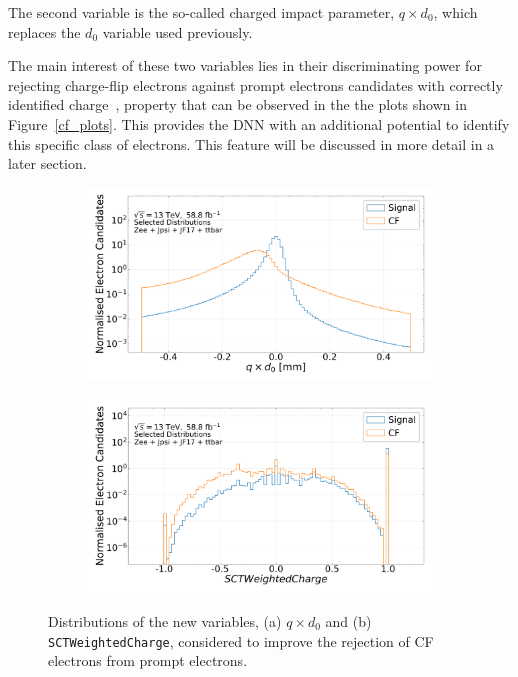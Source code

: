 The second variable is the so-called charged impact parameter, $q \times d_{0}$, which replaces the $d_{0}$ variable used previously.

The main interest of these two variables lies in their discriminating power for rejecting charge-flip electrons against prompt electrons candidates with correctly identified charge~\cite{carnelli}, property that can be observed in the the plots shown in Figure~\ref{cf_plots}. This provides the DNN with an additional potential to identify this specific class of electrons. This feature will be discussed in more detail in a later section.

\begin{figure}[htbp]
  \centering
  \begin{subfigure}[b]{0.49\textwidth}
      \includegraphics[width=\textwidth]{images/selection_MultiClass_qd0_train.pdf}
      \caption{}
  \end{subfigure}
  \begin{subfigure}[b]{0.49\textwidth}
      \includegraphics[width=\textwidth]{images/selection_MultiClass_sctweightedcharge_train.pdf}
      \caption{}
  \end{subfigure}
  \caption{Distributions of the new variables, (a) $q \times d_{0}$ and (b) \texttt{SCTWeightedCharge}, considered to improve the rejection of CF electrons from prompt electrons.}
  \label{fig:corrected}
\end{figure}

